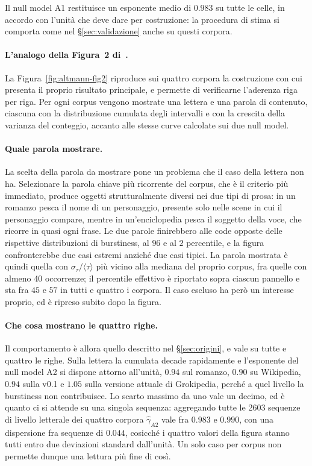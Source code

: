 Il null model A1 restituisce un esponente medio di $0.983$ su tutte le celle,
in accordo con l'unità che deve dare per costruzione: la procedura di stima si
comporta come nel §\ref{sec:validazione} anche su questi corpora.

\paragraph{L'analogo della Figura~2 di~\cite{altmann2012}.}
La Figura~\ref{fig:altmann-fig2} riproduce sui quattro corpora la costruzione
con cui~\cite{altmann2012} presenta il proprio risultato principale, e permette
di verificarne l'aderenza riga per riga. Per ogni corpus vengono mostrate una
lettera e una parola di contenuto, ciascuna con la distribuzione cumulata degli
intervalli e con la crescita della varianza del conteggio, accanto alle stesse
curve calcolate sui due null model.

\paragraph{Quale parola mostrare.} La scelta della parola da mostrare pone un
problema che il caso della lettera non ha. Selezionare la parola chiave più
ricorrente del corpus, che è il criterio più immediato, produce oggetti
strutturalmente diversi nei due tipi di prosa: in un romanzo pesca il nome di
un personaggio, presente solo nelle scene in cui il personaggio compare,
mentre in un'enciclopedia pesca il soggetto della voce, che ricorre in quasi
ogni frase. Le due parole finirebbero alle code opposte delle rispettive
distribuzioni di burstiness, al $96$ e al $2$ percentile, e la figura
confronterebbe due casi estremi anziché due casi tipici. La parola mostrata è
quindi quella con $\sigma_\tau/\langle\tau\rangle$ più vicino alla mediana del
proprio corpus, fra quelle con almeno \num{40} occorrenze; il percentile
effettivo è riportato sopra ciascun pannello e sta fra $45$ e $57$ in tutti e
quattro i corpora. Il caso escluso ha però un interesse proprio, ed è ripreso
subito dopo la figura.

\paragraph{Che cosa mostrano le quattro righe.}
Il comportamento è allora quello descritto nel §\ref{sec:origini}, e vale su
tutte e quattro le righe. Sulla lettera la cumulata decade rapidamente e
l'esponente del null model A2 si dispone attorno all'unità, $0.94$ sul romanzo,
$0.90$ su Wikipedia, $0.94$ sulla v0.1 e $1.05$ sulla versione attuale di
Grokipedia, perché a quel livello la burstiness non contribuisce. Lo scarto
massimo da uno vale un decimo, ed è quanto ci si attende su una singola
sequenza: aggregando tutte le \num{2603} sequenze di livello letterale dei
quattro corpora $\hat\gamma_{A2}$ vale fra $0.983$ e $0.990$, con una
dispersione fra sequenze di $0.044$, cosicché i quattro valori della figura
stanno tutti entro due deviazioni standard dall'unità. Un solo caso per corpus
non permette dunque una lettura più fine di così.

